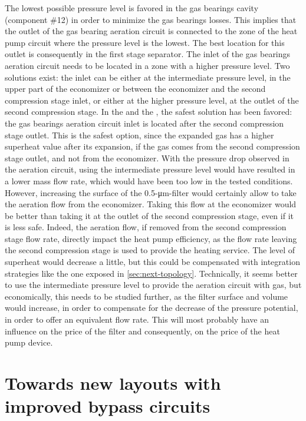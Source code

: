 The lowest possible pressure level is favored in the gas bearings
cavity (component \#12) in order to minimize the gas bearings
losses. This implies that the outlet of the gas bearing aeration
circuit is connected to the zone of the heat pump circuit where the
pressure level is the lowest. The best location for this outlet is
consequently in the first stage separator. The inlet of the gas
bearings aeration circuit needs to be located in a zone with a higher
pressure level. Two solutions exist: the inlet can be either at the
intermediate pressure level, in the upper part of the economizer or
between the economizer and the second compression stage inlet, or
either at the higher pressure level, at the outlet of the second
compression stage. In the \BWP{} and the \AWP{}, the safest solution
has been favored: the gas bearings aeration circuit inlet is located
after the second compression stage outlet. This is the safest option,
since the expanded gas has a higher superheat value after its
expansion, if the gas comes from the second compression stage outlet,
and not from the economizer. With the pressure drop observed in the
\AWP{} aeration circuit, using the intermediate pressure level would
have resulted in a lower mass flow rate, which would have been too low
in the tested conditions. However, increasing the surface of the
0.5-\si{\micro\meter}-filter would certainly allow to take the
aeration flow from the economizer. Taking this flow at the economizer
would be better than taking it at the outlet of the second compression
stage, even if it is less safe. Indeed, the aeration flow, if removed
from the second compression stage flow rate, directly impact the heat
pump efficiency, as the flow rate leaving the second compression stage
is used to provide the heating service. The level of superheat would
decrease a little, but this could be compensated with integration
strategies like the one exposed in
\cref{sec:next-topology}. Technically, it seems better to use the
intermediate pressure level to provide the aeration circuit with gas,
but economically, this needs to be studied further, as the filter
surface and volume would increase, in order to compensate for the
decrease of the pressure potential, in order to offer an equivalent
flow rate. This will most probably have an influence on the price of
the filter and consequently, on the price of the heat pump device.

\section{Towards new layouts with improved
  bypass circuits}
\label{sec:cp-intg-new-bypass}

